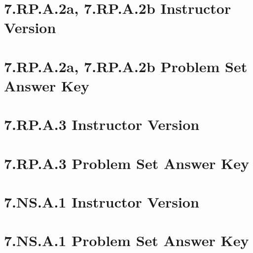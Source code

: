 \documentclass[a4paper,12pt]{article}
\title{}
\date{}
\newcommand{\startPageNumbers}{\setcounter{page}{1}}
\begin{document}


\hypertarget{toc}{}
\tableofcontents
\newpage
\startPageNumbers

\pagestyle{fancy}  %

\newpage
\section{7.RP.A.2a, 7.RP.A.2b Instructor Version}


\newpage
\section{7.RP.A.2a, 7.RP.A.2b Problem Set Answer Key}


\newpage
\section{7.RP.A.3 Instructor Version}


\newpage
\section{7.RP.A.3 Problem Set Answer Key}


\newpage
\section{7.NS.A.1 Instructor Version}


\newpage
\section{7.NS.A.1 Problem Set Answer Key}

\end{document}
